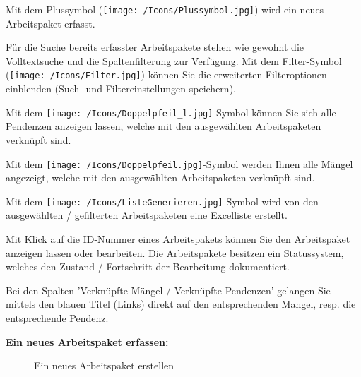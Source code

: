 \begin{compactitem}
	\item Mit dem Plussymbol (\texttt{[image: /Icons/Plussymbol.jpg]}) wird ein neues Arbeitspaket erfasst. 
	\item Für die Suche bereits erfasster Arbeitspakete stehen wie gewohnt die Volltextsuche und die Spaltenfilterung zur Verfügung. Mit dem Filter-Symbol (\texttt{[image: /Icons/Filter.jpg]}) können Sie die erweiterten Filteroptionen einblenden (Such- und Filtereinstellungen speichern).
	\item Mit dem \texttt{[image: /Icons/Doppelpfeil\_l.jpg]}-Symbol können Sie sich alle Pendenzen anzeigen lassen, welche mit den ausgewählten Arbeitspaketen verknüpft sind.
	\item Mit dem \texttt{[image: /Icons/Doppelpfeil.jpg]}-Symbol werden Ihnen alle Mängel angezeigt, welche mit den ausgewählten Arbeitspaketen verknüpft sind.
	\item Mit dem \texttt{[image: /Icons/ListeGenerieren.jpg]}-Symbol wird von den ausgewählten / gefilterten Arbeitspaketen eine Excelliste erstellt.
\end{compactitem}

\vspace{\baselineskip}

Mit Klick auf die ID-Nummer eines Arbeitspakets können Sie den Arbeitspaket anzeigen lassen oder bearbeiten. Die Arbeitspakete besitzen ein Statussystem, welches den Zustand / Fortschritt der Bearbeitung dokumentiert.

\vspace{\baselineskip}

Bei den Spalten 'Verknüpfte Mängel / Verknüpfte Pendenzen' gelangen Sie mittels den blauen Titel (Links) direkt auf den entsprechenden Mangel, resp. die entsprechende Pendenz.

\pagebreak
\textbf{Ein neues Arbeitspaket erfassen:}

\begin{figure}[H]
\caption{Ein neues Arbeitspaket erstellen}
\end{figure}

